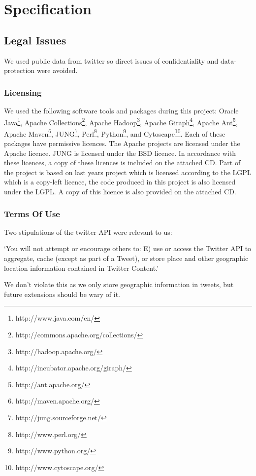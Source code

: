 \chapter{Specification}

\section{Legal Issues}

We used public data from twitter so direct issues of confidentiality and data-protection were avoided.

\subsection{Licensing}

We used the following software tools and packages during this project: Oracle Java\footnote{http://www.java.com/en/}, Apache Collections\footnote{http://commons.apache.org/collections/}, Apache Hadoop\footnote{http://hadoop.apache.org/}, Apache Giraph\footnote{http://incubator.apache.org/giraph/}, Apache Ant\footnote{http://ant.apache.org/}, Apache Maven\footnote{http://maven.apache.org/}, JUNG\footnote{http://jung.sourceforge.net/}, Perl\footnote{http://www.perl.org/}, Python\footnote{http://www.python.org/}, and Cytoscape\footnote{http://www.cytoscape.org/}. Each of these packages have permissive licences. The Apache projects are licensed under the Apache licence. JUNG is licensed under the BSD licence. In accordance with these licences, a copy of these licences is included on the attached CD. Part of the project is based on last years project which is licensed according to the LGPL which is a copy-left licence, the code produced in this project is also licensed under the LGPL. A copy of this licence is also provided on the attached CD.

\subsection{Terms Of Use}

Two stipulations of the twitter API were relevant to us:

`You will not attempt or encourage others to: E) use or access the Twitter API to aggregate, 
cache (except as part of a Tweet), or store place and other geographic location information 
contained in Twitter Content.'

We don't violate this as we only store geographic information in tweets, but future extensions should be wary of it.

